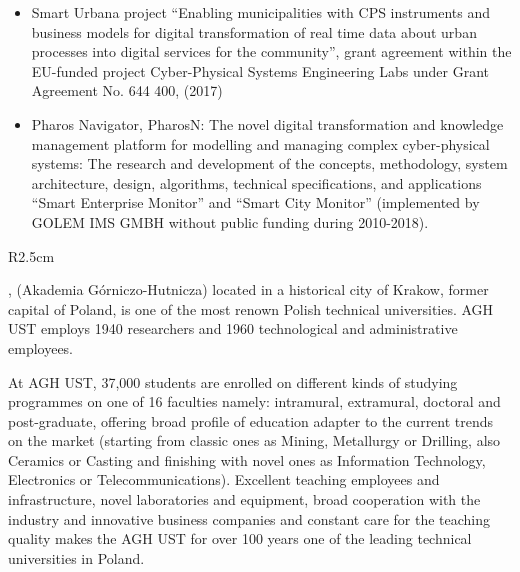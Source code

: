 \documentclass[a4paper,11pt]{article}
\begin{document}
\begin{itemize}
\item
{Smart Urbana} project ``Enabling municipalities with CPS instruments and business models for digital transformation of real time data about urban processes into digital services for the community'', grant agreement within the EU-funded project Cyber-Physical Systems Engineering Labs under Grant Agreement No. 644 400, (2017) 

\item
Pharos Navigator\textregistered, PharosN: The novel digital transformation and knowledge management platform for modelling and managing complex cyber-physical systems: The research and development of the concepts, methodology, system architecture, design, algorithms, technical specifications, and applications ``Smart Enterprise Monitor'' and ``Smart City Monitor'' (implemented by GOLEM IMS GMBH without public funding during 2010-2018).  
\end{itemize}


\begin{wrapfigure}{R}{2.5cm}
\vspace{-2cm}
\hfill {}
\vspace{-0.4cm}
\end{wrapfigure} 

\AGHlong, (Akademia Górniczo-Hutnicza) located in a historical city of Krakow, former capital of Poland, is one of the most renown Polish technical universities. AGH UST employs 1940 researchers and 1960 technological and administrative employees.

At AGH UST, 37,000 students are enrolled on different kinds of studying programmes on one of 16 faculties namely: intramural, extramural, doctoral and post-graduate, offering broad profile of education adapter to the current trends on the market (starting from classic ones as Mining, Metallurgy or Drilling, also Ceramics or Casting and finishing with novel ones as Information Technology, Electronics or Telecommunications). Excellent teaching employees and infrastructure, novel laboratories and equipment, broad cooperation with the industry and innovative business companies and constant care for the teaching quality makes the AGH UST for over 100 years one of the leading technical universities in Poland. 
\end{document}
